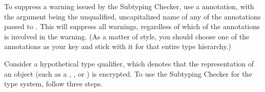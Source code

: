 To suppress a warning issued by the Subtyping Checker, use a
annotation, with the argument being the unqualified, uncapitalized name of
any of the annotations passed to .  This will suppress all
warnings, regardless of which of the annotations is involved in the
warning.  (As a matter of style, you should choose one of the annotations
as your  key and stick with it for that entire type
hierarchy.)



Consider a hypothetical  type qualifier, which denotes that the
representation of an object (such as a , , or
) is encrypted. To use the Subtyping Checker for the 
type system, follow three steps.

